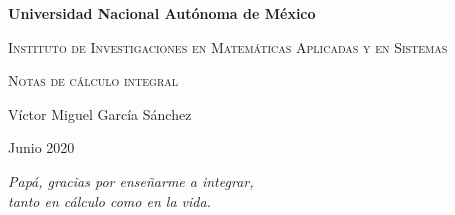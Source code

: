 \begin{titlepage}
\centering
\vspace{1cm}
{\bfseries\LARGE Universidad Nacional Autónoma de México\par}
\vspace{1cm}
{\scshape\Large Instituto de Investigaciones en Matemáticas Aplicadas y en Sistemas\par}
\vspace{3cm}
{\scshape\Huge Notas de cálculo integral \par}
\vspace{3cm}
\vfill
{\Large Víctor Miguel García Sánchez \par}
\vfill
{\Large Junio 2020 \par}
\end{titlepage}
\begin{flushright}%
  \emph{Papá, gracias por enseñarme a integrar,\\tanto en cálculo como en la vida.}
  \thispagestyle{empty}
\end{flushright}
\maketitle